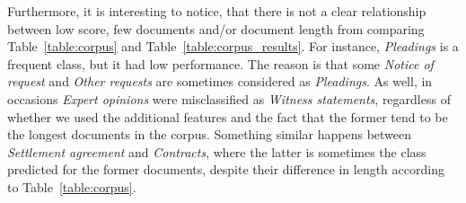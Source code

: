 \documentclass[11pt]{article}
\begin{document}
    Furthermore, it is interesting to notice, that there is not a clear relationship between low score, few documents and/or document length from comparing Table~\ref{table:corpus} and Table~\ref{table:corpus_results}. For instance, \textit{Pleadings} is a frequent class, but it had low performance. The reason is that some \textit{Notice of request} and \textit{Other requests} are sometimes considered as \textit{Pleadings}. As well, in occasions \textit{Expert opinions} were misclassified as \textit{Witness statements}, regardless of whether we used the additional features and the fact that the former tend to be the longest documents in the corpus. Something similar happens between \textit{Settlement agreement} and \textit{Contracts}, where the latter is sometimes the class predicted for the former documents, despite their difference in length according to Table~\ref{table:corpus}.
\end{document}
